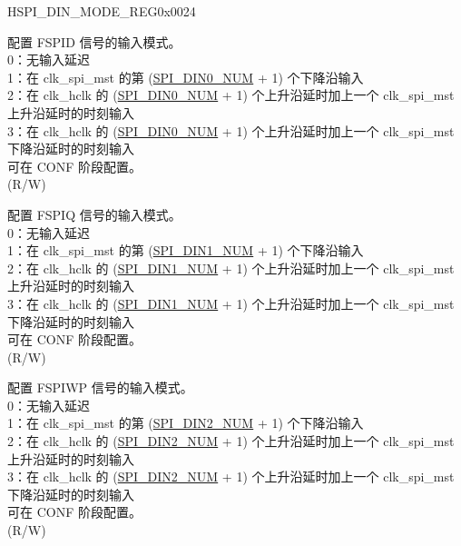 \begin{register}{H}{SPI\_DIN\_MODE\_REG}{0x0024}\label{regdesc:SPIDINMODEREG}
%
%
%
%
%
%
%
%
%
%
\regnewline%
\begin{regdesc}\begin{reglist}
\label{fielddesc:SPIDIN0MODE}\item [SPI\_DIN0\_MODE] 配置 FSPID 信号的输入模式。\\
0：无输入延迟\\
1：在 clk\_spi\_mst 的第 (\hyperref[fielddesc:SPIDIN0NUM]{SPI\_DIN0\_NUM} + 1) 个下降沿输入\\
2：在 clk\_hclk 的 (\hyperref[fielddesc:SPIDIN0NUM]{SPI\_DIN0\_NUM} + 1) 个上升沿延时加上一个 clk\_spi\_mst 上升沿延时的时刻输入\\
3：在 clk\_hclk 的 (\hyperref[fielddesc:SPIDIN0NUM]{SPI\_DIN0\_NUM} + 1) 个上升沿延时加上一个 clk\_spi\_mst 下降沿延时的时刻输入\\
可在 CONF 阶段配置。\\
(R/W)
\label{fielddesc:SPIDIN1MODE}\item [SPI\_DIN1\_MODE] 配置 FSPIQ 信号的输入模式。\\
0：无输入延迟\\
1：在 clk\_spi\_mst 的第 (\hyperref[fielddesc:SPIDIN1NUM]{SPI\_DIN1\_NUM} + 1) 个下降沿输入\\
2：在 clk\_hclk 的 (\hyperref[fielddesc:SPIDIN1NUM]{SPI\_DIN1\_NUM} + 1) 个上升沿延时加上一个 clk\_spi\_mst 上升沿延时的时刻输入\\
3：在 clk\_hclk 的 (\hyperref[fielddesc:SPIDIN1NUM]{SPI\_DIN1\_NUM} + 1) 个上升沿延时加上一个 clk\_spi\_mst 下降沿延时的时刻输入\\
可在 CONF 阶段配置。\\ 
(R/W)
\label{fielddesc:SPIDIN2MODE}\item [SPI\_DIN2\_MODE] 配置 FSPIWP 信号的输入模式。\\
0：无输入延迟\\
1：在 clk\_spi\_mst 的第 (\hyperref[fielddesc:SPIDIN2NUM]{SPI\_DIN2\_NUM} + 1) 个下降沿输入\\
2：在 clk\_hclk 的 (\hyperref[fielddesc:SPIDIN2NUM]{SPI\_DIN2\_NUM} + 1) 个上升沿延时加上一个 clk\_spi\_mst 上升沿延时的时刻输入\\
3：在 clk\_hclk 的 (\hyperref[fielddesc:SPIDIN2NUM]{SPI\_DIN2\_NUM} + 1) 个上升沿延时加上一个 clk\_spi\_mst 下降沿延时的时刻输入\\
可在 CONF 阶段配置。\\
(R/W)
\item [见下页]
\end{reglist}\end{regdesc}
\end{register}

